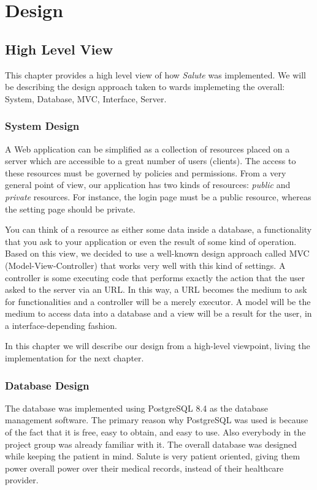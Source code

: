 \documentclass[12pt]{report}
\begin{document}
\part{Design}

\chapter{High Level View}
This chapter provides a high level view of how \emph{Salute} was implemented.  We will be describing the design approach taken to wards implemeting the overall: System, Database, MVC, Interface, Server.

\section{System Design}
A Web application can be simplified as a collection of resources placed on a server which are accessible to a great number of users (clients). The access to these resources must be governed by policies and permissions. From a very general point of view, our application has two kinds of resources: \emph{public} and \emph{private} resources. For instance, the login page must be a public resource, whereas the setting page should be private.

You can think of a resource as either some data inside a database, a functionality that you ask to your application or even the result of some kind of operation. Based on this view, we decided to use a well-known design approach called MVC (Model-View-Controller) that works very well with this kind of settings. A controller is some executing code that performs exactly the action that the user asked to the server via an URL. In this way, a URL becomes the medium to ask for functionalities and a controller will be a merely executor. A model will be the medium to access data into a database and a view will be a result for the user, in a interface-depending fashion.

In this chapter we will describe our design from a high-level viewpoint, living the implementation for the next chapter.

\section{Database Design}
The database was implemented using PostgreSQL 8.4 as the database management software.  The primary reason why PostgreSQL was used is because of the fact that it is free, easy to obtain, and easy to use. Also everybody in the project group was already familiar with it.
The overall database was designed while keeping the patient in mind.  Salute is very patient oriented, giving them power overall  power over their medical records, instead of their healthcare provider.
\end{document}
